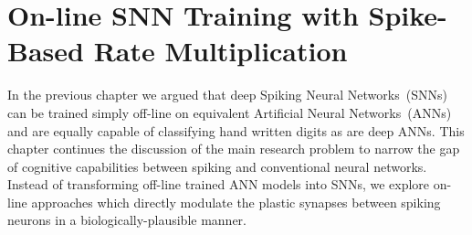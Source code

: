\chapter[On-line SNN Training with SRM]{On-line SNN Training with Spike-Based Rate Multiplication}
\label{cha:sdlm}
In the previous chapter we argued that deep Spiking Neural Networks~(SNNs) can be trained simply off-line on equivalent Artificial Neural Networks~(ANNs) and are equally capable of classifying hand written digits as are deep ANNs.
This chapter continues the discussion of the main research problem to narrow the gap of cognitive capabilities between spiking and conventional neural networks.
Instead of transforming off-line trained ANN models into SNNs, we explore on-line approaches which directly modulate the plastic synapses between spiking neurons in a biologically-plausible manner.


